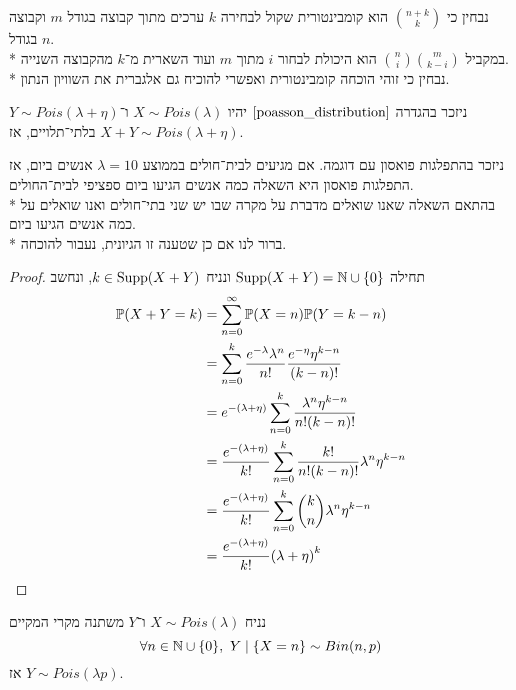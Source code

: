 \begin{solution}
	נבחין כי $\binom{n + k}{k}$ הוא קומבינטורית שקול לבחירה $k$ ערכים מתוך קבוצה בגודל $m$ וקבוצה בגודל $n$. \\*
	במקביל $\binom{n}{i} \binom{m}{k - i}$ הוא היכולת לבחור $i$ מתוך $m$ ועוד השארית מ־$k$ מהקבוצה השנייה. \\*
	נבחין כי זוהי הוכחה קומבינטורית ואפשרי להוכיח גם אלגברית את השוויון הנתון.
\end{solution}
\begin{proposition}
	ניזכר בהגדרה $\ref{poasson_distribution}$ יהיו $X \sim Pois(\lambda)$ ו־$Y \sim Pois(\lambda + \eta)$ בלתי־תלויים, אז $X + Y \sim Pois(\lambda + \eta)$.
\end{proposition}
ניזכר בהתפלגות פואסון עם דוגמה.
אם מגיעים לבית־חולים בממוצע $\lambda = 10$ אנשים ביום, אז התפלגות פואסון היא השאלה כמה אנשים הגיעו ביום ספציפי לבית־החולים. \\*
בהתאם השאלה שאנו שואלים מדברת על מקרה שבו יש שני בתי־חולים ואנו שואלים על כמה אנשים הגיעו ביום. \\*
ברור לנו אם כן שטענה זו הגיונית, נעבור להוכחה.
\begin{proof}
	תחילה $\operatorname{Supp}(X + Y) = \mathbb{N} \cup \{0\}$ ונניח $k \in \operatorname{Supp}(X + Y)$, ונחשב
	\begin{align*}
		\mathbb{P}(X + Y = k)
		& = \sum_{n = 0}^{\infty} \mathbb{P}(X = n) \mathbb{P}(Y = k - n) \\
		& = \sum_{n = 0}^{k} \frac{e^{-\lambda} \lambda^n}{n!} \frac{e^{-\eta} \eta^{k - n}}{(k - n)!} \\
		& = e^{-(\lambda + \eta)} \sum_{n = 0}^{k} \frac{\lambda^n \eta^{k - n}}{n! (k - n)!} \\
		& = \frac{e^{-(\lambda + \eta)}}{k!} \sum_{n = 0}^{k} \frac{k!}{n! (k - n)!} \lambda^n \eta^{k - n} \\
		& = \frac{e^{-(\lambda + \eta)}}{k!} \sum_{n = 0}^{k} \binom{k}{n} \lambda^n \eta^{k - n} \\
		& = \frac{e^{-(\lambda + \eta)}}{k!} {(\lambda + \eta)}^k
	\end{align*}
\end{proof}
\begin{proposition}
	נניח $X \sim Pois(\lambda)$ ו־$Y$ משתנה מקרי המקיים
	\[
		\forall n \in \mathbb{N} \cup \{0\},\ Y \mid \{X = n\} \sim Bin(n, p)
	\]
	אז $Y \sim Pois(\lambda p)$.
\end{proposition}
